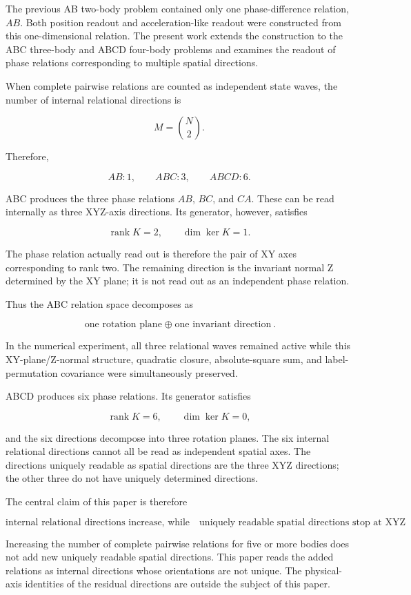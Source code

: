 \documentclass[
  10pt,
  a4paper,
]{article}
\begin{document}
The previous AB two-body problem contained only one phase-difference
relation, \(AB\). Both position readout and acceleration-like readout
were constructed from this one-dimensional relation. The present work
extends the construction to the ABC three-body and ABCD four-body
problems and examines the readout of phase relations corresponding to
multiple spatial directions.

When complete pairwise relations are counted as independent state waves,
the number of internal relational directions is

\[
M=\binom{N}{2}.
\]

Therefore,

\[
AB:1,
\qquad
ABC:3,
\qquad
ABCD:6.
\]

ABC produces the three phase relations \(AB\), \(BC\), and \(CA\). These
can be read internally as three XYZ-axis directions. Its generator,
however, satisfies

\[
\operatorname{rank}K=2,
\qquad
\dim\ker K=1.
\]

The phase relation actually read out is therefore the pair of XY axes
corresponding to rank two. The remaining direction is the invariant
normal Z determined by the XY plane; it is not read out as an
independent phase relation.

Thus the ABC relation space decomposes as

\[
\boxed{
\text{one rotation plane}
\;\oplus\;
\text{one invariant direction}
}.
\]

In the numerical experiment, all three relational waves remained active
while this XY-plane/Z-normal structure, quadratic closure,
absolute-square sum, and label-permutation covariance were
simultaneously preserved.

ABCD produces six phase relations. Its generator satisfies

\[
\operatorname{rank}K=6,
\qquad
\dim\ker K=0,
\]

and the six directions decompose into three rotation planes. The six
internal relational directions cannot all be read as independent spatial
axes. The directions uniquely readable as spatial directions are the
three XYZ directions; the other three do not have uniquely determined
directions.

The central claim of this paper is therefore

\[
\boxed{
\text{internal relational directions increase, while}
\quad
\text{uniquely readable spatial directions stop at XYZ}
}.
\]

Increasing the number of complete pairwise relations for five or more
bodies does not add new uniquely readable spatial directions. This paper
reads the added relations as internal directions whose orientations are
not unique. The physical-axis identities of the residual directions are
outside the subject of this paper.
\end{document}
